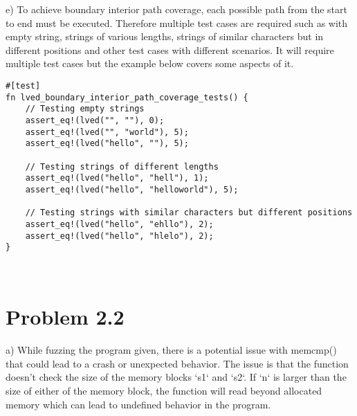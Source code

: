 \documentclass{article}
\begin{document}
e) To achieve boundary interior path coverage, each possible path from the start to end must be executed. Therefore multiple test cases are required such as with empty string, strings of various lengths, strings of similar characters but in different positions and other test cases with different scenarios. It will require multiple test cases but the example below covers some aspects of it. 

\begin{verbatim}
#[test]
fn lved_boundary_interior_path_coverage_tests() {
    // Testing empty strings
    assert_eq!(lved("", ""), 0);
    assert_eq!(lved("", "world"), 5);
    assert_eq!(lved("hello", ""), 5);

    // Testing strings of different lengths
    assert_eq!(lved("hello", "hell"), 1);
    assert_eq!(lved("hello", "helloworld"), 5);

    // Testing strings with similar characters but different positions
    assert_eq!(lved("hello", "ehllo"), 2);
    assert_eq!(lved("hello", "hlelo"), 2);
}

    
\end{verbatim}
    
\section{Problem 2.2}

a) While fuzzing the program given, there is a potential issue with memcmp() that could lead to a crash or unexpected behavior. The issue is that the function doesn't check the size of the memory blocks `s1` and `s2`. If `n` is larger than the size of either of the memory block, the function will read beyond allocated memory which can lead to undefined behavior in the program. 
\end{document}
